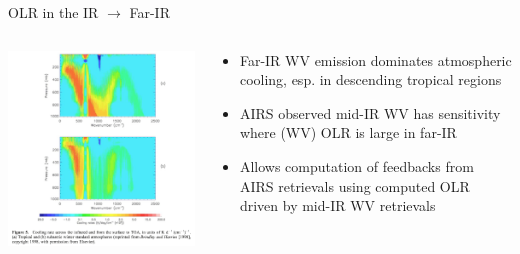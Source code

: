\documentclass[10pt,t]{beamer}
\begin{document}
\begin{frame}{OLR in the IR $\rightarrow$ Far-IR}
\begin{block}{}

\vspace{-0.1in}
\begin{columns}

\begin{column}{0.55\columnwidth}
\begin{block}{}
\vspace{-0.1in}
\begin{center}
\includegraphics[width=\linewidth]{NEWFIGS/image_spectralOLR.png}
\end{center}
\end{block}
\end{column}

\begin{column}{0.55\columnwidth}
\begin{block}{}
\begin{itemize}
\item Far-IR WV emission dominates atmospheric cooling, esp. in descending tropical regions
\item AIRS observed mid-IR WV has sensitivity where (WV) OLR is large in far-IR
\item Allows computation of feedbacks from AIRS retrievals using computed OLR driven by mid-IR WV retrievals
\end{itemize}
\end{block}
\end{column}

\end{columns}

\end{block}
\end{frame}
\end{document}
